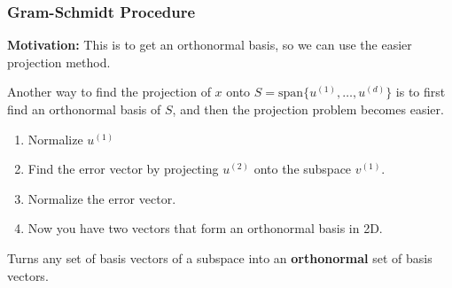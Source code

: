     \subsubsection{Gram-Schmidt Procedure}
    \textbf{Motivation:} This is to get an orthonormal basis, so we can use the easier projection method.
    \begin{intuition}
        Another way to find the projection of \(x\) onto $S = \text{span} \{u^{(1)}, \dots, u^{(d)}\}$ is to first find an orthonormal basis of \(S\), and then the projection problem becomes easier.
        \begin{enumerate}
            \item Normalize $u^{(1)}$ 
            \item Find the error vector by projecting $u^{(2)}$ onto the subspace $v^{(1)}$.
            \item Normalize the error vector.
            \item Now you have two vectors that form an orthonormal basis in 2D.
        \end{enumerate}
    \end{intuition}

    \begin{definition}
        Turns any set of basis vectors of a subspace into an \textbf{orthonormal} set of basis vectors.
    \end{definition}

